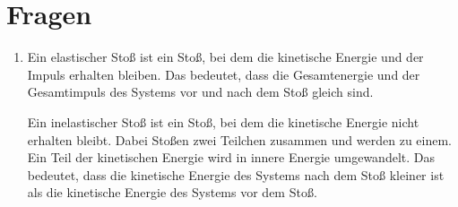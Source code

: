 \documentclass[11pt, a4paper]{article}
\begin{document}
    \section{Fragen}

    \begin{enumerate}
        \item Ein elastischer Stoß ist ein Stoß, bei dem die kinetische Energie und der Impuls erhalten bleiben. Das bedeutet, dass die Gesamtenergie und der Gesamtimpuls des Systems vor und nach dem Stoß gleich sind.

        Ein inelastischer Stoß ist ein Stoß, bei dem die kinetische Energie nicht erhalten bleibt. Dabei Stoßen zwei Teilchen zusammen und werden zu einem. Ein Teil der kinetischen Energie wird in innere Energie umgewandelt. Das bedeutet, dass die kinetische Energie des Systems nach dem Stoß kleiner ist als die kinetische Energie des Systems vor dem Stoß.


\end{enumerate}
\end{document}
